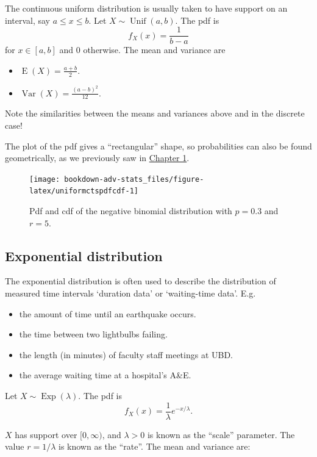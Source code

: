 \documentclass[
]{book}
\providecommand{\tightlist}{%
  \setlength{\itemsep}{0pt}\setlength{\parskip}{0pt}}
\DeclareMathOperator{\E}{E}
\DeclareMathOperator{\Var}{Var}
\DeclareMathOperator{\Exp}{Exp}
\DeclareMathOperator{\Unif}{Unif}
\theoremstyle{definition}
\theoremstyle{definition}
\theoremstyle{definition}
\theoremstyle{definition}
\theoremstyle{remark}
\begin{document}
The continuous uniform distribution is usually taken to have support on an interval, say \(a \leq x \leq b\). Let \(X\sim\Unif(a,b)\). The pdf is
\[
  f_X(x) = \frac{1}{b-a}
\]
for \(x\in[a,b]\) and 0 otherwise.
The mean and variance are

\begin{itemize}
\tightlist
\item
  \(\E(X)=\frac{a+b}{2}\).
\item
  \(\Var(X)=\frac{(a-b)^2}{12}\).
\end{itemize}

Note the similarities between the means and variances above and in the discrete case!

The plot of the pdf gives a ``rectangular'' shape, so probabilities can also be found geometrically, as we previously saw in \protect\hyperlink{exm:unitsquare}{Chapter 1}.

\begin{figure}

{\centering \texttt{[image: bookdown-adv-stats\_files/figure-latex/uniformctspdfcdf-1]} 

}

\caption{Pdf and cdf of the negative binomial distribution with \(p=0.3\) and \(r=5\).}\label{fig:uniformctspdfcdf}
\end{figure}

\hypertarget{exponential-distribution}{%
\subsection{Exponential distribution}\label{exponential-distribution}}

The exponential distribution is often used to describe the distribution of measured time intervals `duration data' or `waiting-time data'. E.g.

\begin{itemize}
\tightlist
\item
  the amount of time until an earthquake occurs.
\item
  the time between two lightbulbs failing.
\item
  the length (in minutes) of faculty staff meetings at UBD.
\item
  the average waiting time at a hospital's A\&E.
\end{itemize}

Let \(X\sim\Exp(\lambda)\).
The pdf is
\[
f_X(x) = \frac{1}{\lambda} e^{-x/\lambda}.
\]

\(X\) has support over \([0,\infty)\), and \(\lambda >0\) is known as the ``scale'' parameter. The value \(r=1/\lambda\) is known as the ``rate''. The mean and variance are:
\end{document}
